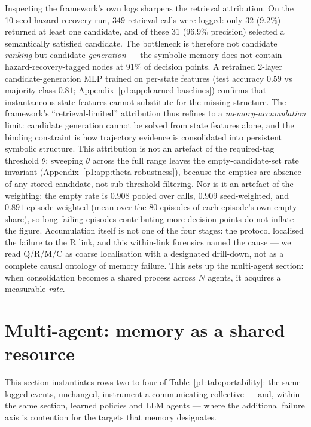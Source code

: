 \documentclass{article}
\begin{document}
Inspecting the framework's own logs sharpens the retrieval attribution. On the 10-seed hazard-recovery run, $349$ retrieval calls were logged: only $32$ ($9.2\%$) returned at least one candidate, and of these $31$ ($96.9\%$ precision) selected a semantically satisfied candidate. The bottleneck is therefore not candidate \emph{ranking} but candidate \emph{generation} --- the symbolic memory does not contain hazard-recovery-tagged nodes at 91\% of decision points. A retrained 2-layer candidate-generation MLP trained on per-state features (test accuracy $0.59$ vs majority-class $0.81$; Appendix~\ref{p1:app:learned-baselines}) confirms that instantaneous state features cannot substitute for the missing structure. The framework's ``retrieval-limited'' attribution thus refines to a \emph{memory-accumulation} limit: candidate generation cannot be solved from state features alone, and the binding constraint is how trajectory evidence is consolidated into persistent symbolic structure. This attribution is not an artefact of the required-tag threshold $\theta$: sweeping $\theta$ across the full range leaves the empty-candidate-set rate invariant (Appendix~\ref{p1:app:theta-robustness}), because the empties are absence of any stored candidate, not sub-threshold filtering. Nor is it an artefact of the weighting: the empty rate is $0.908$ pooled over calls, $0.909$ seed-weighted, and $0.891$ episode-weighted (mean over the 80 episodes of each episode's own empty share), so long failing episodes contributing more decision points do not inflate the figure. Accumulation itself is not one of the four stages: the protocol localised the failure to the R link, and this within-link forensics named the cause --- we read Q/R/M/C as coarse localisation with a designated drill-down, not as a complete causal ontology of memory failure. This sets up the multi-agent section: when consolidation becomes a shared process across $N$ agents, it acquires a measurable \emph{rate}.

\section{Multi-agent: memory as a shared resource}
\label{p1:sec:multi}

This section instantiates rows two to four of
Table~\ref{p1:tab:portability}: the same logged events, unchanged,
instrument a communicating collective --- and, within the same
section, learned policies and LLM agents --- where the additional
failure axis is contention for the targets that memory designates.
\end{document}
